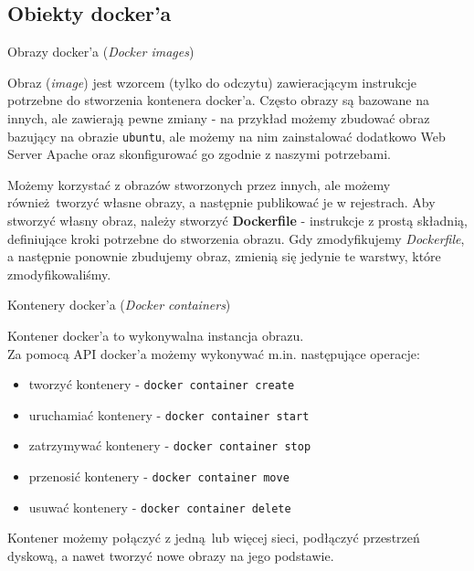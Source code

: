 \documentclass[aspectratio=169]{beamer}
\begin{document}
\subsection{Obiekty docker'a}
\begin{frame}{Obrazy docker'a (\textit{Docker images})}
    \begin{card}
        Obraz (\textit{image}) jest wzorcem (tylko do odczytu) zawieracjącym instrukcje potrzebne do stworzenia kontenera docker'a.
        Często obrazy są bazowane na innych, ale zawierają pewne zmiany - na przykład możemy zbudować obraz bazujący na obrazie \colorbox{dark-gray}{\lstinline{ubuntu}},
        ale możemy na nim zainstalować dodatkowo Web Server Apache oraz skonfigurować go zgodnie z naszymi potrzebami.
    \end{card}
    \begin{cardTiny}
        Możemy korzystać z obrazów stworzonych przez innych, ale możemy również tworzyć własne obrazy, a następnie publikować je w rejestrach.
        Aby stworzyć własny obraz, należy stworzyć \textbf{Dockerfile} - instrukcje z prostą składnią, definiujące kroki potrzebne do stworzenia
        obrazu. Gdy zmodyfikujemy \textit{Dockerfile}, a następnie ponownie zbudujemy obraz, zmienią się jedynie te warstwy, które zmodyfikowaliśmy.
    \end{cardTiny}

\end{frame}

\begin{frame}{Kontenery docker'a (\textit{Docker containers})}
    \begin{card}
        Kontener docker'a to wykonywalna instancja obrazu. \\
        Za pomocą API docker'a możemy wykonywać m.in. następujące operacje:
        \begin{itemize}
            \item tworzyć kontenery - \colorbox{dark-gray}{\lstinline{docker container create}}
            \item uruchamiać kontenery - \colorbox{dark-gray}{\lstinline{docker container start}}
            \item zatrzymywać kontenery - \colorbox{dark-gray}{\lstinline{docker container stop}}
            \item przenosić kontenery - \colorbox{dark-gray}{\lstinline{docker container move}}
            \item usuwać kontenery - \colorbox{dark-gray}{\lstinline{docker container delete}}
        \end{itemize}
    \end{card}
    \begin{cardTiny}
        Kontener możemy połączyć z jedną lub więcej sieci, podłączyć przestrzeń dyskową, a nawet tworzyć nowe obrazy na jego podstawie.
    \end{cardTiny}
\end{frame}
\end{document}
